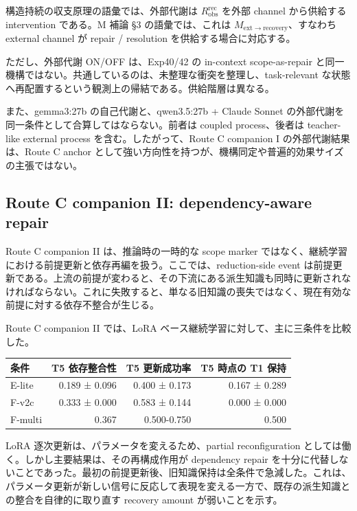 \documentclass[12pt,a4paper]{article}
\begin{document}
構造持続の収支原理の語彙では、外部代謝は \(R_{\mathrm{obs}}^{\mathrm{rec}}\) を外部 channel から供給する intervention である。M 補論 §3 の語彙では、これは \(M_{\mathrm{ext}\to\mathrm{recovery}}\)、すなわち external channel が repair / resolution を供給する場合に対応する。

ただし、外部代謝 ON/OFF は、Exp40/42 の in-context scope-as-repair と同一機構ではない。共通しているのは、未整理な衝突を整理し、task-relevant な状態へ再配置するという観測上の帰結である。供給階層は異なる。

また、gemma3:27b の自己代謝と、qwen3.5:27b + Claude Sonnet の外部代謝を同一条件として合算してはならない。前者は coupled process、後者は teacher-like external process を含む。したがって、Route C companion I の外部代謝結果は、Route C anchor として強い方向性を持つが、機構同定や普遍的効果サイズの主張ではない。

\subsection{Route C companion II: dependency-aware repair}\label{route-c-companion-ii-dependency-aware-repair}

Route C companion II は、推論時の一時的な scope marker ではなく、継続学習における前提更新と依存再編を扱う。ここでは、reduction-side event は前提更新である。上流の前提が変わると、その下流にある派生知識も同時に更新されなければならない。これに失敗すると、単なる旧知識の喪失ではなく、現在有効な前提に対する依存不整合が生じる。

Route C companion II では、LoRA ベース継続学習に対して、主に三条件を比較した。

{\def\LTcaptype{table} %
\begin{longtable}[]{@{}lrrr@{}}
\toprule\noalign{}
条件 & T5 依存整合性 & T5 更新成功率 & T5 時点の T1 保持 \\
\midrule\noalign{}
\endhead
\bottomrule\noalign{}
\endlastfoot
E-lite & 0.189 ± 0.096 & 0.400 ± 0.173 & 0.167 ± 0.289 \\
F-v2c & 0.333 ± 0.000 & 0.583 ± 0.144 & 0.000 ± 0.000 \\
F-multi & 0.367 & 0.500-0.750 & 0.500 \\
\end{longtable}
}

LoRA 逐次更新は、パラメータを変えるため、partial reconfiguration としては働く。しかし主要結果は、その再構成作用が dependency repair を十分に代替しないことであった。最初の前提更新後、旧知識保持は全条件で急減した。これは、パラメータ更新が新しい信号に反応して表現を変える一方で、既存の派生知識との整合を自律的に取り直す recovery amount が弱いことを示す。
\end{document}
